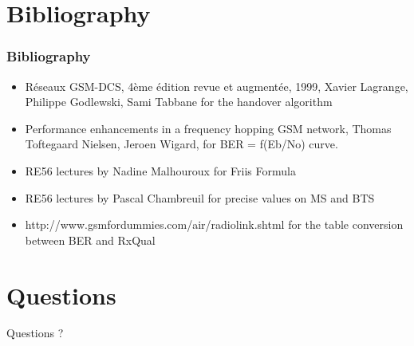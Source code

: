 \documentclass{beamer}
\begin{document}
\section*{Bibliography}

\begin{frame}
\frametitle{Bibliography}

\begin{itemize}
  \item Réseaux GSM-DCS, 4ème édition revue et augmentée, 1999, Xavier Lagrange,
Philippe Godlewski, Sami Tabbane for the handover algorithm
  \item Performance enhancements in a frequency hopping GSM network, Thomas Toftegaard Nielsen, Jeroen Wigard, for BER = f(Eb/No) curve.
  \item RE56 lectures by Nadine Malhouroux for Friis Formula
  \item RE56 lectures by Pascal Chambreuil for precise values on MS and BTS
  \item http://www.gsmfordummies.com/air/radiolink.shtml for the table conversion between BER and RxQual
\end{itemize}
\end{frame}

\section*{Questions}

\begin{frame}
\begin{center}
Questions ?
\end{center}
\end{frame}
\end{document}
